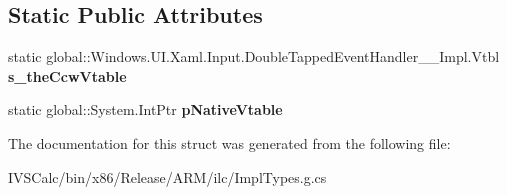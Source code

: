 \subsection*{Static Public Attributes}
\begin{DoxyCompactItemize}
\item 
\mbox{\label{struct_windows_1_1_u_i_1_1_xaml_1_1_input_1_1_double_tapped_event_handler_____impl_1_1_vtbl_a77b6af94dfcac341e37f5df585335f4e}} 
static global\+::\+Windows.\+U\+I.\+Xaml.\+Input.\+Double\+Tapped\+Event\+Handler\+\_\+\+\_\+\+Impl.\+Vtbl {\bfseries s\+\_\+the\+Ccw\+Vtable}
\item 
\mbox{\label{struct_windows_1_1_u_i_1_1_xaml_1_1_input_1_1_double_tapped_event_handler_____impl_1_1_vtbl_a3fbbc1d3c51fc23781209e8fa6bd37e9}} 
static global\+::\+System.\+Int\+Ptr {\bfseries p\+Native\+Vtable}
\end{DoxyCompactItemize}


The documentation for this struct was generated from the following file\+:\begin{DoxyCompactItemize}
\item 
I\+V\+S\+Calc/bin/x86/\+Release/\+A\+R\+M/ilc/Impl\+Types.\+g.\+cs\end{DoxyCompactItemize}
